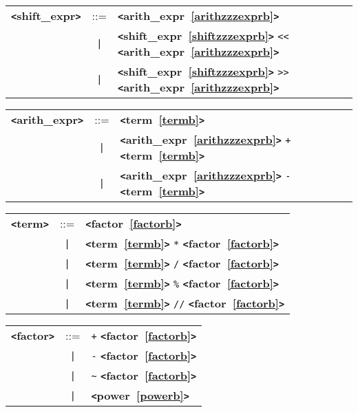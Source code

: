\label{shiftzzzexprb}
\begin{tabular}{lcl}
{\bf \verb+<+shift\_expr\verb+>+} & ::=  & {\bf \verb+<+arith\_expr~\ref{arithzzzexprb}\verb+>+}  \\
 & \verb+|+  & {\bf \verb+<+shift\_expr~\ref{shiftzzzexprb}\verb+>+}  \verb|<<| {\bf \verb+<+arith\_expr~\ref{arithzzzexprb}\verb+>+}  \\
 & \verb+|+  & {\bf \verb+<+shift\_expr~\ref{shiftzzzexprb}\verb+>+}  \verb|>>| {\bf \verb+<+arith\_expr~\ref{arithzzzexprb}\verb+>+}  \\
\end{tabular}

\label{arithzzzexprb}
\begin{tabular}{lcl}
{\bf \verb+<+arith\_expr\verb+>+} & ::=  & {\bf \verb+<+term~\ref{termb}\verb+>+}  \\
 & \verb+|+  & {\bf \verb+<+arith\_expr~\ref{arithzzzexprb}\verb+>+}  \verb|+| {\bf \verb+<+term~\ref{termb}\verb+>+}  \\
 & \verb+|+  & {\bf \verb+<+arith\_expr~\ref{arithzzzexprb}\verb+>+}  \verb|-| {\bf \verb+<+term~\ref{termb}\verb+>+}  \\
\end{tabular}

\label{termb}
\begin{tabular}{lcl}
{\bf \verb+<+term\verb+>+} & ::=  & {\bf \verb+<+factor~\ref{factorb}\verb+>+}  \\
 & \verb+|+  & {\bf \verb+<+term~\ref{termb}\verb+>+}  \verb|*| {\bf \verb+<+factor~\ref{factorb}\verb+>+}  \\
 & \verb+|+  & {\bf \verb+<+term~\ref{termb}\verb+>+}  \verb|/| {\bf \verb+<+factor~\ref{factorb}\verb+>+}  \\
 & \verb+|+  & {\bf \verb+<+term~\ref{termb}\verb+>+}  \verb|%| {\bf \verb+<+factor~\ref{factorb}\verb+>+}  \\
 & \verb+|+  & {\bf \verb+<+term~\ref{termb}\verb+>+}  \verb|//| {\bf \verb+<+factor~\ref{factorb}\verb+>+}  \\
\end{tabular}

\label{factorb}
\begin{tabular}{lcl}
{\bf \verb+<+factor\verb+>+} & ::=  & \verb|+| {\bf \verb+<+factor~\ref{factorb}\verb+>+}  \\
 & \verb+|+  & \verb|-| {\bf \verb+<+factor~\ref{factorb}\verb+>+}  \\
 & \verb+|+  & \verb|~| {\bf \verb+<+factor~\ref{factorb}\verb+>+}  \\
 & \verb+|+  & {\bf \verb+<+power~\ref{powerb}\verb+>+}  \\
\end{tabular}

